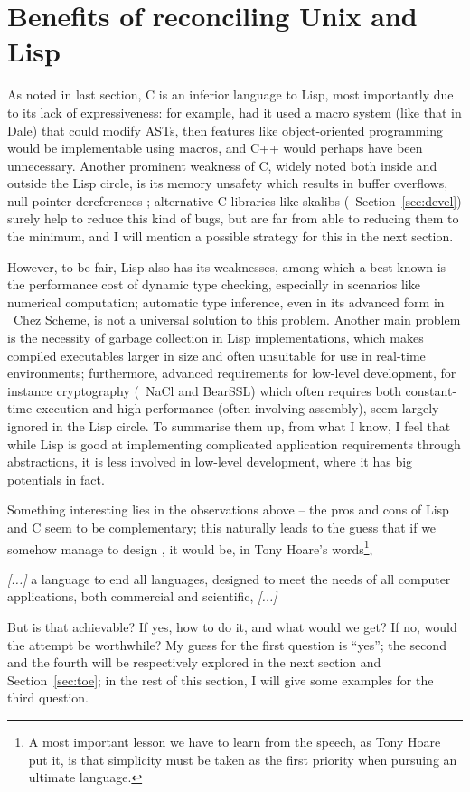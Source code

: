 \section{Benefits of reconciling Unix and Lisp}\label{sec:benefits}

As noted in last section, C is an inferior language to Lisp, most importantly
due to its lack of expressiveness: for example, had it used a macro system (like
that in Dale) that could modify ASTs, then features like
object-oriented programming would be implementable using macros, and C++ would
perhaps have been unnecessary.  Another prominent weakness of C, widely noted
both inside and outside the Lisp circle, is its memory unsafety which results
in buffer overflows, null-pointer dereferences \etc; alternative C libraries
like skalibs (\cf~Section~\ref{sec:devel}) surely help to reduce this kind
of bugs, but are far from able to reducing them to the minimum, and
I will mention a possible strategy for this in the next section.

However, to be fair, Lisp also has its weaknesses, among which a best-known is
the performance cost of dynamic type checking, especially in scenarios like
numerical computation; automatic type inference, even in its advanced form in
\eg~Chez Scheme, is not a universal solution to this problem.  Another main
problem is the necessity of garbage collection in Lisp implementations, which
makes compiled executables larger in size and often unsuitable for use in
real-time environments; furthermore, advanced requirements for low-level
development, for instance cryptography (\cf~NaCl and BearSSL) which often
requires both constant-time execution and high performance (often involving
assembly), seem largely ignored in the Lisp circle. To summarise them up,
from what I know, I feel that while Lisp is good at implementing complicated
application requirements through abstractions, it is less involved
in low-level development, where it has big potentials in fact.

Something interesting lies in the observations above -- the pros and cons
of Lisp and C seem to be complementary; this naturally leads to the guess
that if we somehow manage to design , it would be,
in Tony Hoare's words\footnote{A most important lesson we
have to learn from the speech, as Tony Hoare put it, is that simplicity must
be taken as the first priority when pursuing an ultimate language.},
\begin{quoting}
	\emph{[...]} a language to end all languages, designed to meet the needs
	of all computer applications, both commercial and scientific, \emph{[...]}
\end{quoting}
But is that achievable?  If yes, how to do it, and what would we get?
If no, would the attempt be worthwhile?  My guess for the first question
is ``yes''; the second and the fourth will be respectively explored
in the next section and Section~\ref{sec:toe}; in the rest of
this section, I will give some examples for the third question.


